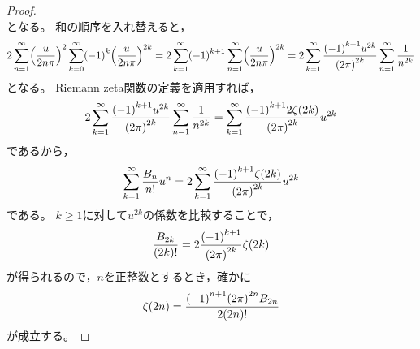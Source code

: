 \documentclass[a4paper,draft]{ltjsarticle}
\begin{document}
\begin{thm}[正の偶数点$z=2n$における$\fun{\zeta}{z}$の特殊値]
\begin{proof}
\begin{equation}
        \end{equation}
        となる。
        和の順序を入れ替えると，
        \begin{equation}
            2\sum_{n=1}^\infty \pare{\frac{u}{2n\pi}}^2\sum_{k=0}^\infty \pare{-1}^k\pare{\frac{u}{2n\pi}}^{2k}
            =2\sum_{k=1}^\infty \pare{-1}^{k+1}\sum_{n=1}^\infty \pare{\frac{u}{2n\pi}}^{2k}=2\sum_{k=1}^\infty \frac{\pare{-1}^{k+1}u^{2k}}{\pare{2\pi}^{2k}}\sum_{n=1}^\infty \frac{1}{n^{2k}}
        \end{equation}
        となる。
        Riemann zeta関数の定義を適用すれば，
        \begin{equation}
            2\sum_{k=1}^\infty \frac{\pare{-1}^{k+1}u^{2k}}{\pare{2\pi}^{2k}}\sum_{n=1}^\infty \frac{1}{n^{2k}}=\sum_{k=1}^\infty \frac{\pare{-1}^{k+1}2\fun{\zeta}{2k}}{\pare{2\pi}^{2k}}u^{2k}
        \end{equation}
        であるから，
        \begin{equation}
            \sum_{k=1}^\infty\frac{B_n}{n!}u^n=2\sum_{k=1}^\infty \frac{\pare{-1}^{k+1}\fun{\zeta}{2k}}{\pare{2\pi}^{2k}}u^{2k}
        \end{equation}
        である。
        $k\geq 1$に対して$u^{2k}$の係数を比較することで，
        \begin{equation}
            \frac{B_{2k}}{\pare{2k}!}=2\frac{\pare{-1}^{k+1}}{\pare{2\pi}^{2k}}\fun{\zeta}{2k}
        \end{equation}
        が得られるので，$n$を正整数とするとき，確かに
        \begin{equation}
            \fun{\zeta}{2n}=\frac{\pare{-1}^{n+1}\pare{2\pi}^{2n}B_{2n}}{2\pare{2n}!}
        \end{equation}
        が成立する。
    \end{proof}
\end{thm}
\end{document}
